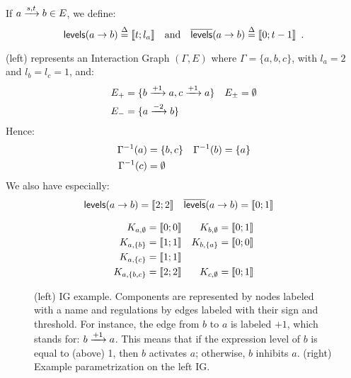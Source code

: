 \begin{definition}\label{def:levels}
If $a \xrightarrow{s, t} b \in E$, we define:
$$\mathsf{levels}(a\rightarrow b) \stackrel{\Delta}= \llbracket t ; l_a \rrbracket \quad \text{and} \quad \overline{\mathsf{levels}}(a\rightarrow b) \stackrel{\Delta}= \llbracket 0 ; t-1 \rrbracket \enspace.$$
\end{definition}

\begin{example}
(left) represents an Interaction Graph $(\Gamma,E)$ where
$\Gamma = \{a, b, c\}$, with $l_a = 2$ and $l_b = l_c = 1$,
and:
\begin{align*}
  E_+ &= \{b \xrightarrow{+ 1} a, c \xrightarrow{+ 1} a\} &
  E_\pm &= \emptyset \\
  E_- &= \{a \xrightarrow{- 2} b\}
\end{align*}
Hence:
\begin{align*}
  \Gamma^{-1}(a) &= \{ b, c \} &
  \Gamma^{-1}(b) &= \{ a \} \\
  \Gamma^{-1}(c) &= \emptyset
\end{align*}
We also have especially:
\begin{align*}
  \mathsf{levels}(a\rightarrow b) &= \llbracket 2 ; 2 \rrbracket & \overline{\mathsf{levels}}(a\rightarrow b) &= \llbracket 0 ; 1 \rrbracket
\end{align*}
\end{example}

\begin{figure}[t]
\begin{minipage}{0.4\linewidth}
\centering
{}
\end{minipage}
\begin{minipage}{0.6\linewidth}
\centering
\begin{align*}
  K_{a,\emptyset} &= \llbracket 0 ; 0 \rrbracket & K_{b,\emptyset} &= \llbracket 0 ; 1 \rrbracket \\
  K_{a,\{b\}} &= \llbracket 1 ; 1 \rrbracket & K_{b,\{a\}} &= \llbracket 0 ; 0 \rrbracket \\
  K_{a,\{c\}} &= \llbracket 1 ; 1 \rrbracket &&\\
  K_{a,\{b,c\}} &= \llbracket 2 ; 2 \rrbracket & K_{c,\emptyset} &= \llbracket 0 ; 1 \rrbracket
\end{align*}
\end{minipage}
\caption{\label{fig:runningBRN}
  (left)
  IG example.
  Components are represented by nodes labeled with a name
  and regulations by edges labeled with their sign and threshold.
  For instance, the edge from $b$ to $a$ is labeled $+1$, which stands for: $b \xrightarrow{+ 1} a$.
  This means that if the expression level of $b$ is equal to (\ie above) 1, then $b$ activates $a$;
  otherwise, $b$ inhibits $a$.
  (right)
  Example parametrization on the left IG.
}
\end{figure}

